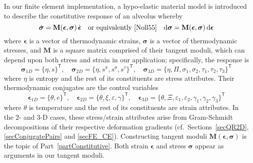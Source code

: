 In our finite element implementation, a hypo-elastic material model \cite{Truesdell55} is introduced to describe the constitutive response of an alveolus whereby
\begin{displaymath}
    \dot{\boldsymbol{\sigma}} = \mathbf{M} ( \boldsymbol{\epsilon} , \boldsymbol{\sigma} ) \, \dot{\boldsymbol{\epsilon}} 
    \quad \text{or equivalently \cite{Noll55}} \quad
    \mathrm{d} \boldsymbol{\sigma} = \mathbf{M} ( \boldsymbol{\epsilon} , \boldsymbol{\sigma} ) \, \mathrm{d} \boldsymbol{\epsilon}
\end{displaymath} 
where $\boldsymbol{\epsilon}$ is a vector of thermo\-dynamic strains, $\boldsymbol{\sigma}$ is a vector of thermo\-dynamic stresses, and $\mathbf{M}$ is a square matrix comprised of their tangent moduli, which can depend upon both stress and strain in our application; specifically, the response is
\begin{displaymath}
   \boldsymbol{\sigma}_{1D} = \{ \eta , s \}^{\mathsf{T}} , \quad
   \boldsymbol{\sigma}_{2D} = \{ \eta , s^{\pi} , s^{\sigma} , s^{\tau} \}^{\mathsf{T}} , \quad
   \boldsymbol{\sigma}_{3D} = \{ \eta , \Pi , \sigma_1 , \sigma_2 , \tau_1 , \tau_2 , \tau_3 \}^{\mathsf{T}}
\end{displaymath}
where $\eta$ is entropy and the rest of its constituents are stress attributes.  Their thermo\-dynamic conjugates are the control variables
\begin{displaymath}
\boldsymbol{\epsilon}_{1D} = \{ \theta , e \}^{\mathsf{T}} , \quad
\boldsymbol{\epsilon}_{2D} = \{ \theta , \xi , \varepsilon , \gamma \}^{\mathsf{T}} , \quad
\boldsymbol{\epsilon}_{3D} = \{ \theta , \Xi , \varepsilon_1 , \varepsilon_2 , \gamma_1 , \gamma_2 , \gamma_3 \}^{\mathsf{T}}
\end{displaymath}
where $\theta$ is temperature and the rest of its constituents are strain attributes.  In the 2- and 3-D cases, these stress\slash strain attributes arise from Gram-Schmidt decompositions of their respective deformation gradients (cf.\ Sections~\ref{secQR2D}, \ref{secConjugatePairs} and \ref{secFE_CE}).  Constructing tangent moduli $\mathbf{M} ( \boldsymbol{\epsilon} , \boldsymbol{\sigma} )$ is the topic of Part~\ref{partConstitutive}.  Both strain $\boldsymbol{\epsilon}$ and stress $\boldsymbol{\sigma}$ appear as arguments in our tangent moduli.

